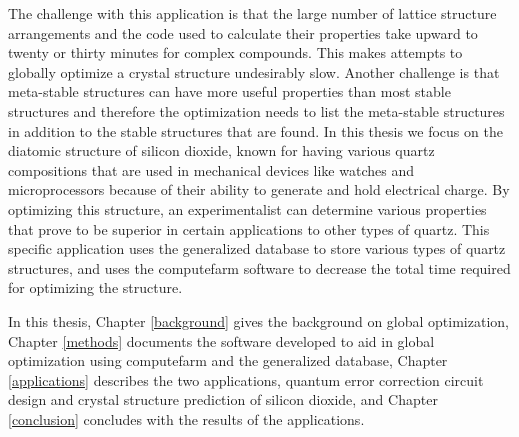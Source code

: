 The challenge with this application is that the large number of lattice structure arrangements and the code used to calculate their properties take upward to twenty or thirty minutes for complex compounds. This makes attempts to globally optimize a crystal structure undesirably slow. Another challenge is that meta-stable structures can have more useful properties than most stable structures and therefore the optimization needs to list the meta-stable structures in addition to the stable structures that are found. 
In this thesis we focus on the diatomic structure of silicon dioxide, known for having various quartz compositions that are used in mechanical devices like watches and microprocessors because of their ability to generate and hold electrical charge. By optimizing this structure, an experimentalist can determine various properties that prove to be superior in certain applications to other types of quartz. This specific application uses the generalized database to store various types of quartz structures, and uses the computefarm software to decrease the total time required for optimizing the structure.

In this thesis, Chapter \ref{background} gives the background on global optimization, Chapter \ref{methods} documents the software developed to aid in global optimization using computefarm and the generalized database, Chapter \ref{applications} describes the two applications, quantum error correction circuit design and crystal structure prediction of silicon dioxide, and Chapter \ref{conclusion} concludes with the results of the applications.
